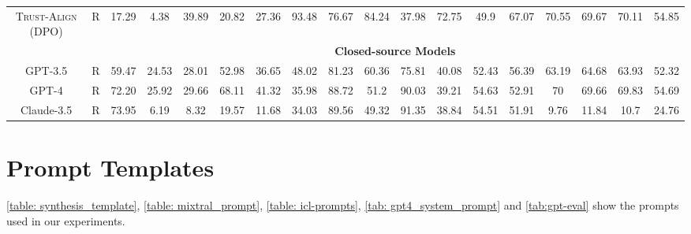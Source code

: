 \documentclass{article} %
\newcommand{\method}[0]{\textsc{Trust-Align}}
\begin{document}
\begin{table}[htb!]
{\begin{tabular}{ccc*{15}c}
\method{} (DPO) & R & 17.29 & 4.38 & 39.89 & 20.82 & 27.36 & 93.48 & 76.67 & 84.24 & 37.98 & 72.75 & 49.9 & 67.07 & 70.55 & 69.67 & 70.11 & 54.85 \\

& & \multicolumn{16}{c}{\cellcolor[gray]{0.9}\textbf{Closed-source Models}} \\
GPT-3.5 & R & 59.47 & 24.53 & 28.01 & 52.98 & 36.65 & 48.02 & 81.23 & 60.36 & 75.81 & 40.08 & 52.43 & 56.39 & 63.19 & 64.68 & 63.93 & 52.32 \\
GPT-4 & R & 72.20 & 25.92 & 29.66 & 68.11 & 41.32 & 35.98 & 88.72 & 51.2 & 90.03 & 39.21 & 54.63 & 52.91 & 70 & 69.66 & 69.83 & 54.69 \\
Claude-3.5 & R & 73.95 & 6.19 & 8.32 & 19.57 & 11.68 & 34.03 & 89.56 & 49.32 & 91.35 & 38.84 & 54.51 & 51.91 & 9.76 & 11.84 & 10.7 & 24.76 \\

\bottomrule
\end{tabular}

}

\end{table}


\section{Prompt Templates} \label{app:prompt-template}
\cref{table: synthesis_template}, \cref{table: mixtral_prompt}, \cref{table: icl-prompts}, \cref{tab: gpt4_system_prompt} and \cref{tab:gpt-eval} show the prompts used in our experiments. 

\end{document}
